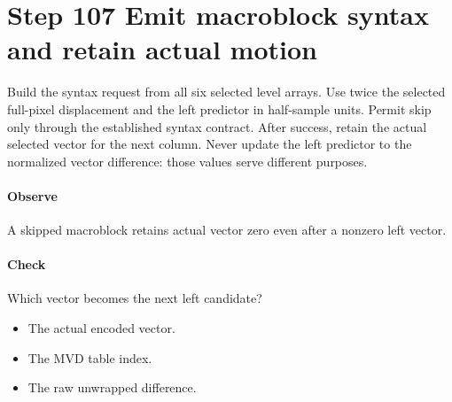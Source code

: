 \section{Step 107 Emit macroblock syntax and retain actual motion}\label{h263-picture-s07}
Build the syntax request from all six selected level arrays. Use twice the
selected full-pixel displacement and the left predictor in half-sample units.
Permit skip only through the established syntax contract. After success, retain
the actual selected vector for the next column. Never update the left predictor
to the normalized vector difference: those values serve different purposes.

\paragraph{Observe} A skipped macroblock retains actual vector zero even after a nonzero left vector.
\paragraph{Check} Which vector becomes the next left candidate?
\begin{itemize}
  \item[A.] The actual encoded vector.
  \item[B.] The MVD table index.
  \item[C.] The raw unwrapped difference.
\end{itemize}

